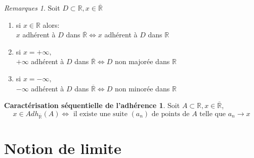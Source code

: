 \documentclass[fleqn]{article}
\theoremstyle{definition} \newtheorem*{defi}{D\'efinition}
\theoremstyle{definition} \newtheorem*{theo}{Th\'eor\`eme}
\theoremstyle{definition} \newtheorem*{adh}{Caract\'erisation s\'equentielle de l'adh\'erence}
\theoremstyle{remark} \newtheorem*{rqs}{Remarques}
\begin{document}
\begin{rqs}
	Soit $D \subset \mathbb{R}, x \in \overline{\mathbb{R}}$
	\begin{enumerate}
		\item si $x \in \mathbb{R}$ alors: \\
			$x$ adh\'erent \`a $D$ dans $\overline{\mathbb{R}} \Leftrightarrow x$ adh\'erent \`a $D$ dans $\mathbb{R}$
		\item si $x = +\infty,$ \\
			$+\infty$ adh\'erent \`a $D$ dans $\overline{\mathbb{R}} \Leftrightarrow D$ non major\'ee dans $\mathbb{R}$
		\item si $x = -\infty,$ \\
			$-\infty$ adh\'erent \`a $D$ dans $\overline{\mathbb{R}} \Leftrightarrow D$ non minor\'ee dans $\mathbb{R}$
	\end{enumerate}
\end{rqs}
\begin{adh}
	Soit $A \subset \mathbb{R}, x \in \overline{\mathbb{R}}$,
	\[x \in Adh_{\overline{\mathbb{R}}}(A) \Leftrightarrow \text{ il existe une suite } (a_n) \text{ de points de } A \text{ telle que }
	a_n \rightarrow x\]
\end{adh}

\section{Notion de limite}
\end{document}
